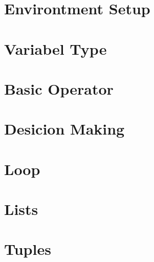 \documentclass{wileySix}
\begin{document}
\chapter{Environtment Setup}


%

\chapter{Variabel Type}


\chapter{Basic Operator}


\chapter{Desicion Making}


\chapter{Loop}


%

%

\chapter{Lists}


\chapter{Tuples}


%
\end{document}
